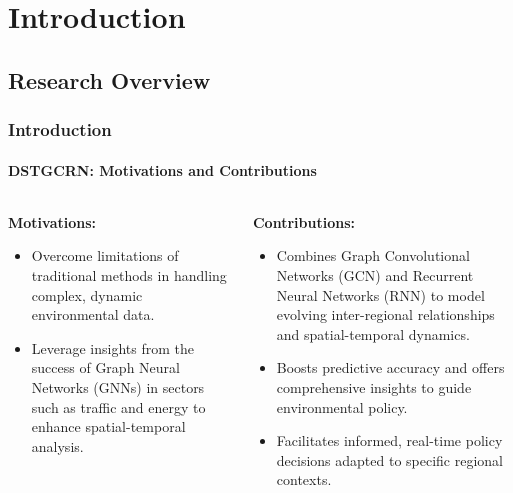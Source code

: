 \documentclass[light]{lutbeamer} %
\begin{document}
{ %
}
\section{Introduction}

\subsection{Research Overview}


\begin{frame}
    \frametitle{Introduction}
    \framesubtitle{DSTGCRN: Motivations and Contributions}
    \begin{columns}[T] %
        \begin{column}{0.45\textwidth}
            \textbf{Motivations:}
            \begin{itemize}
                \item Overcome limitations of traditional methods in handling complex, dynamic environmental data.
                \item Leverage insights from the success of Graph Neural Networks (GNNs) in sectors such as traffic and energy to enhance spatial-temporal analysis.
            \end{itemize}
        \end{column}
        \begin{column}{0.45\textwidth}
            \textbf{Contributions:}
            \begin{itemize}
                \item Combines Graph Convolutional Networks (GCN) and Recurrent Neural Networks (RNN) to model evolving inter-regional relationships and spatial-temporal dynamics.
                \item Boosts predictive accuracy and offers comprehensive insights to guide environmental policy.
                \item Facilitates informed, real-time policy decisions adapted to specific regional contexts.
            \end{itemize}
        \end{column}
    \end{columns}
\end{frame}
\end{document}
